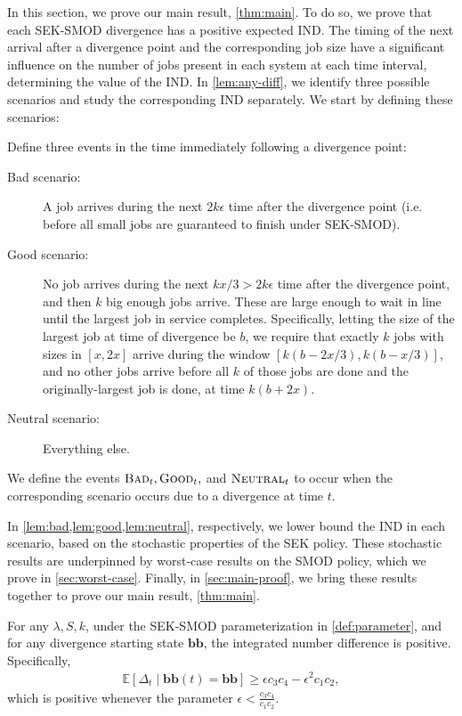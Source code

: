 \documentclass[acmsmall]{acmart}
\newcommand{\E}[1]{\mathbb{E}[#1]}
\newcommand{\bb}{\boldsymbol{b}}
\newcommand{\bbb}{\bb\bb}
\newcommand{\bad}{\textsc{Bad}}
\newcommand{\good}{\textsc{Good}}
\newcommand{\neutral}{\textsc{Neutral}}
\begin{document}
In this section, we prove our main result, \cref{thm:main}.
To do so, we prove that each SEK-SMOD divergence has a positive expected IND. The timing of the next arrival after a divergence point and the corresponding job size have a significant influence on the number of jobs present in each system at each time interval, determining the value of the IND.  In \cref{lem:any-diff}, we identify three possible scenarios and study the corresponding IND separately. We start by defining these scenarios:
\begin{definition}\label{def:good-bad-neutral}
    Define three events in the time immediately following a divergence point:
    \begin{description}
        \item[Bad scenario:] A job arrives during the next $2k\epsilon$ time after the divergence point (i.e. before all small jobs are guaranteed to finish under SEK-SMOD).
        \item[Good scenario:] No job arrives during the next $kx/3 > 2k\epsilon$ time after the divergence point,
        and then $k$ big enough jobs arrive. These are large enough to wait in line until the largest job in service completes.
        Specifically, letting the size of the largest job at time of divergence be $b$, we require that exactly $k$ jobs with sizes in $[x, 2x]$ arrive during the window $[k(b-2x/3), k(b-x/3)]$, and no other jobs arrive before all $k$ of those jobs are done and the originally-largest job is done, at time $k(b+2x)$.
        \item[Neutral scenario:] Everything else.
    \end{description}
    We define the events $\bad_t, \good_t,$ and $\neutral_t$ to occur when the corresponding scenario occurs due to a divergence at time $t$.
\end{definition}

In \cref{lem:bad,lem:good,lem:neutral}, respectively,
we lower bound the IND in each scenario, based on the stochastic properties of the SEK policy.
These stochastic results are underpinned by worst-case results on the SMOD policy,
which we prove in \cref{sec:worst-case}.
Finally, in \cref{sec:main-proof}, we bring these results together to prove our main result, \cref{thm:main}.


\begin{lemma}
    \label{lem:any-diff}
    For any $\lambda, S, k$, under the SEK-SMOD parameterization in \cref{def:parameter},
    and for any divergence starting state $\bb\bb$, 
    the integrated number difference is positive. Specifically,
    \begin{align*}
        \E{\Delta_t \mid \bbb(t) = \bbb} \geq \epsilon c_3c_4 - \epsilon^2 c_1c_2,
    \end{align*}
    which is positive whenever the parameter $\epsilon<\frac{c_3c_4}{c_1c_2}$.
\end{lemma}
\end{document}
